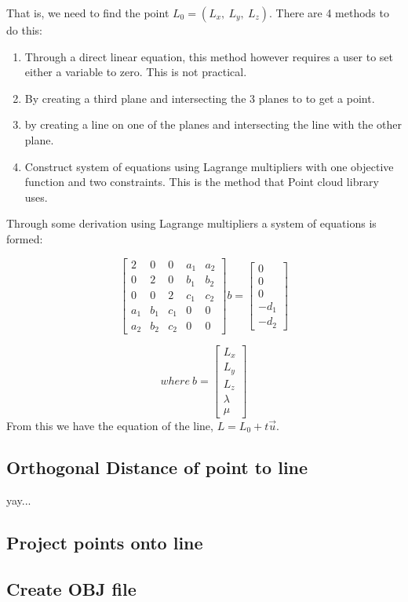 	That is, we need to find the point $L_0 = (L_x,\:L_y,\:L_z)$. There are 4 methods to do this:
	\begin{enumerate}
	\item Through a direct linear equation, this method however requires a user to set either a variable to zero. This is not practical.
	
	\item By creating a third plane and intersecting the 3 planes to to get a point.
	
	\item by creating a line on one of the planes and intersecting the line with the other plane. 
	
	\item Construct system of equations using Lagrange multipliers with one objective function and two constraints. This is the method that Point cloud library uses.
	\end{enumerate}
	
	Through some derivation using Lagrange multipliers a system of equations is formed:
	
	
	\[
	\begin{bmatrix}
	2 & 0 & 0 & a_1 & a_2 \\
	0 & 2 & 0 & b_1 & b_2 \\
	0 & 0 & 2 & c_1 & c_2 \\
	a_1 & b_1 & c_1 & 0 & 0 \\
	a_2 & b_2 & c_2 & 0 & 0
	\end{bmatrix}
	b=
	\begin{bmatrix}
	0 \\
	0\\
	0 \\
	-d_1 \\
	-d_2 
	\end{bmatrix}
	\]
	
	\[
	where\: b = 	\begin{bmatrix}
		L_x \\
		L_y\\
		L_z \\
		\lambda \\
		\mu 
	\end{bmatrix}
	\]
	\newline
	\newline
	From this we have the equation of the line, $L = L_0 + t\vec{u}$.
	
	\subsection{Orthogonal Distance of point to line}
	
	yay...
	
	\subsection{Project points onto line}
	
	\subsection{Create OBJ file}
		

	


